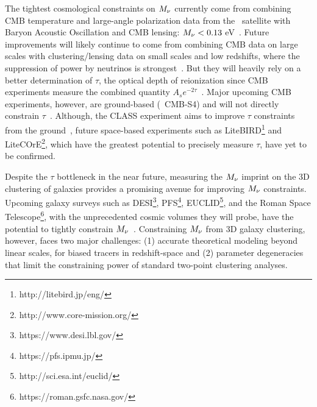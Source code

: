 The tightest cosmological constraints on $M_\nu$ currently come from 
combining CMB temperature and large-angle polarization data from the 
\planck~satellite with Baryon Acoustic Oscillation and CMB lensing: 
$M_\nu < 0.13$ eV~\citep{planckcollaboration2018}. Future improvements
will likely continue to come from combining CMB data on large scales 
with clustering/lensing data on small scales and low redshifts, where 
the suppression of power by neutrinos is strongest~\citep{brinckmann2019}. 
But they will heavily rely on a better determination of $\tau$, the optical
depth of reionization since CMB experiments measure the combined quantity $A_s
e^{-2\tau}$~\citep{allison2015, liu2016, archidiacono2017}.
Major upcoming CMB experiments, however, are ground-based (\eg~CMB-S4) and 
will not directly constrain $\tau$~\citep{abazajian2016}. Although, the CLASS
experiment aims to improve $\tau$ constraints from the ground~\citep{xu2020},
future space-based experiments such as LiteBIRD\footnote{http://litebird.jp/eng/} 
and LiteCOrE\footnote{http://www.core-mission.org/}, which have the greatest 
potential to precisely measure $\tau$, have yet to be confirmed. 

Despite the $\tau$ bottleneck in the near future, measuring the $M_\nu$ imprint 
on the 3D clustering of galaxies provides a promising avenue for improving $M_\nu$ constraints. 
Upcoming galaxy surveys such as DESI\footnote{https://www.desi.lbl.gov/}, 
PFS\footnote{https://pfs.ipmu.jp/}, EUCLID\footnote{http://sci.esa.int/euclid/}, 
and the Roman Space Telescope\footnote{https://roman.gsfc.nasa.gov/}, 
with the unprecedented cosmic volumes they will probe, 
have the potential to tightly constrain 
$M_\nu$~\citep{audren2013, font-ribera2014, petracca2016, sartoris2016, boyle2018}.
Constraining $M_\nu$ from 3D galaxy clustering, however, faces two major 
challenges: (1) accurate theoretical modeling beyond linear scales, for biased
tracers in redshift-space and (2) parameter degeneracies that limit the
constraining power of standard two-point clustering analyses. 

